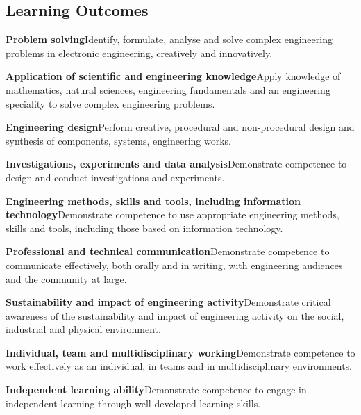\subsection*{Learning Outcomes}
\begin{outline}
    \1      \textbf{Problem solving}\newline Identify, formulate, analyse and solve complex engineering problems in electronic engineering, creatively and innovatively.

    \1      \textbf{Application of scientific and engineering knowledge}\newline Apply knowledge of mathematics, natural sciences, engineering fundamentals and an engineering speciality to solve complex engineering problems.

    \1      \textbf{Engineering design}\newline Perform creative, procedural and non-procedural design and synthesis of components, systems, engineering works.

    \1      \textbf{Investigations, experiments and data analysis}\newline Demonstrate competence to design and conduct investigations and experiments.

    \1      \textbf{Engineering methods, skills and tools, including information technology}\newline Demonstrate competence to use appropriate engineering methods, skills and tools, including those based on information technology.

    \1      \textbf{Professional and technical communication}\newline Demonstrate competence to communicate effectively, both orally and in writing, with engineering audiences and the community at large.

    \1      \textbf{Sustainability and impact of engineering activity}\newline Demonstrate critical awareness of the sustainability and impact of engineering activity on the social, industrial and physical environment.

    \1      \textbf{Individual, team and multidisciplinary working}\newline Demonstrate competence to work effectively as an individual, in teams and in multidisciplinary environments.

    \1      \textbf{Independent learning ability}\newline Demonstrate competence to engage in independent learning through well-developed learning skills.


\end{outline}
